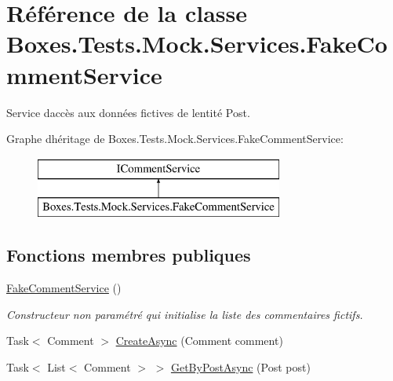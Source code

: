 \hypertarget{class_boxes_1_1_tests_1_1_mock_1_1_services_1_1_fake_comment_service}{}\section{Référence de la classe Boxes.\+Tests.\+Mock.\+Services.\+Fake\+Comment\+Service}
\label{class_boxes_1_1_tests_1_1_mock_1_1_services_1_1_fake_comment_service}


Service d\textquotesingle{}accès aux données fictives de l\textquotesingle{}entité Post.  


Graphe d\textquotesingle{}héritage de Boxes.\+Tests.\+Mock.\+Services.\+Fake\+Comment\+Service\+:\begin{figure}[H]
\begin{center}
\leavevmode
\includegraphics[height=2.000000cm]{class_boxes_1_1_tests_1_1_mock_1_1_services_1_1_fake_comment_service}
\end{center}
\end{figure}
\subsection*{Fonctions membres publiques}
\begin{DoxyCompactItemize}
\item 
\hyperlink{class_boxes_1_1_tests_1_1_mock_1_1_services_1_1_fake_comment_service_a5d6567f4d50c7bb1469b0e81f582e428}{Fake\+Comment\+Service} ()
\begin{DoxyCompactList}\small\item\em Constructeur non paramétré qui initialise la liste des commentaires fictifs. \end{DoxyCompactList}\item 
Task$<$ Comment $>$ \hyperlink{class_boxes_1_1_tests_1_1_mock_1_1_services_1_1_fake_comment_service_a5ecc4acf78554c99498bef433dadd1a7}{Create\+Async} (Comment comment)
\item 
Task$<$ List$<$ Comment $>$ $>$ \hyperlink{class_boxes_1_1_tests_1_1_mock_1_1_services_1_1_fake_comment_service_a79ddddd76c921a8351c6b97fc71cb238}{Get\+By\+Post\+Async} (Post post)
\end{DoxyCompactItemize}
